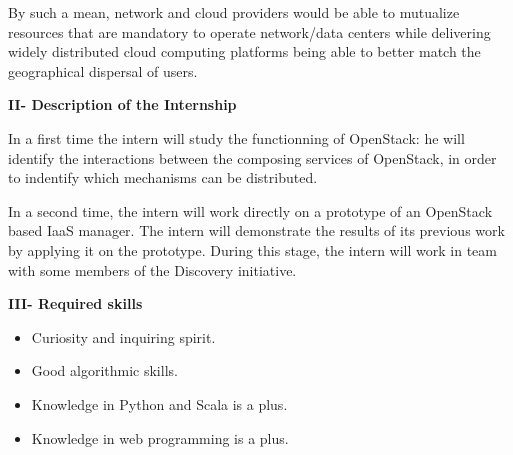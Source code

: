 \documentclass{letter}
\begin{document}
\begin{letter}
By such a mean, network and cloud providers would be able to mutualize resources
that are mandatory to operate network/data centers while delivering widely 
distributed cloud computing platforms being able to better match the 
geographical dispersal of users.

{\Large \textbf{II- Description of the Internship}}

In a first time the intern will study the functionning of OpenStack: he will
identify the interactions between the composing services of OpenStack, in
order to indentify which mechanisms can be distributed.

In a second time, the intern will work directly on a prototype of an OpenStack 
based IaaS manager. The intern will demonstrate the results of its previous work
by applying it on the prototype. During this stage, the intern will work in team
with some members of the Discovery initiative.

{\Large \textbf{III- Required skills}}

\begin{itemize}
\item Curiosity and inquiring spirit.
\item Good algorithmic skills.
\item Knowledge in Python and Scala is a plus.
\item Knowledge in web programming is a plus.
\end{itemize}

\end{letter}
\end{document}
